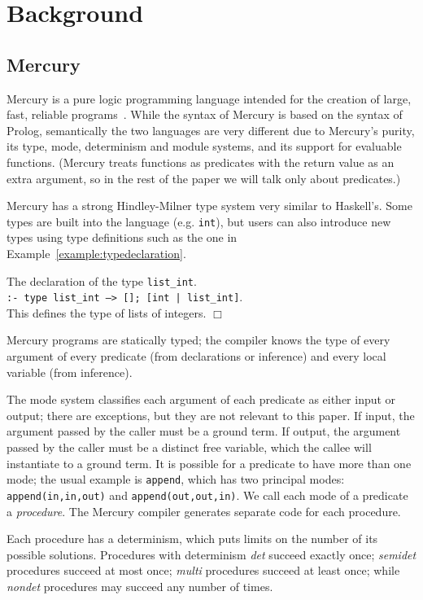 \documentclass{tlp}
\newcommand{\code}[1]{{\tt#1}}
\begin{document}
\section{Background}
\label{seCbg}

\subsection{Mercury}
\label{seCbgCmercury}

Mercury is a pure logic programming language
intended for the creation of large, fast,
reliable programs~\cite{Somogyi96mercury}.
While the syntax of Mercury is based on the syntax of Prolog,
semantically the two languages are very different due to Mercury's purity,
its type, mode, determinism and module systems,
and its support for evaluable functions.
(Mercury treats functions
as predicates with the return value as an extra argument,
so in the rest of the paper we will talk only about predicates.)

Mercury has a strong Hindley-Milner type system very similar to Haskell's.
Some types are built into the language (e.g. \code{int}),
but users can also introduce new types using type definitions
such as the one in Example~\ref{example:typedeclaration}.
\begin{example} The declaration of the type \code{list\_int}.\\
\code{:- type list\_int ---> []; [int | list\_int]}.\\
This defines the type of lists of integers.
\hfill $\Box$
\label{example:typedeclaration}
\end{example}
Mercury programs are statically typed; the compiler knows the type of
every argument of every predicate (from declarations or inference)
and every local variable (from inference).

The mode system classifies each argument of each predicate
as either input or output;
there are exceptions, but they are not relevant to this paper.
If input, the argument passed by the caller must be a ground term.
If output, the argument passed by the caller must be a distinct free variable,
which the callee will instantiate to a ground term.
It is possible for a predicate to have more than one mode;
the usual example is \code{append}, which has two principal modes:
\code{append(in,in,out)} and \code{append(out,out,in)}.
We call each mode of a predicate a \emph{procedure}.
The Mercury compiler generates separate code for each procedure.

Each procedure has a determinism,
which puts limits on the number of its possible solutions.
Procedures with determinism \emph{det} succeed exactly once;
\emph{semidet} procedures succeed at most once;
\emph{multi} procedures succeed at least once;
while \emph{nondet} procedures may succeed any number of times.
\end{document}

